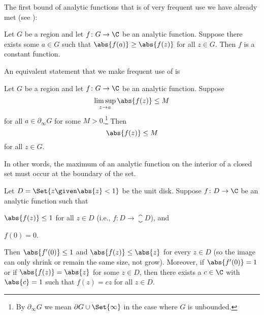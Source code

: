 


The first bound of analytic functions that is of very frequent use we have already met (see ):

\begin{theorem}\label{thm6.1}
	Let $G$ be a region and let $f \colon G \to \C$ be an analytic function.
	Suppose there exists some $a \in G$ such that $\abs{f(a)} \geq \abs{f(z)}$ for all $z \in G$.
	Then $f$ is a constant function.
\end{theorem}

An equivalent statement that we make frequent use of is
\begin{corollary}\label{cor6.2}
	Let $G$ be a region and let $f \colon G \to \C$ be an analytic function.
	Suppose
	\[
		\limsup_{z \to a} \abs{f(z)} \leq M
	\]
	for all $a \in \partial_\infty G$ for some $M > 0$.\footnote{By $\partial_\infty G$ we mean $\partial G \cup \Set{\infty}$ in the case where $G$ is unbounded.}
	Then
	\[
		\abs{f(z)} \leq M
	\]
	for all $z \in G$.
\end{corollary}
In other words, the maximum of an analytic function on the interior of a closed set must occur at the boundary of the set.


\begin{theorem}\label{thm6.2}
	Let $D = \Set{z \given \abs{z} < 1}$ be the unit disk.
	Suppose $f \colon D \to \C$ be an analytic function such that
	\begin{items}
		\item $\abs{f(z)} \leq 1$ for all $z \in D$ (i.e., $f \colon D \to \closure{D}$), and
		\item $f(0) = 0$.
	\end{items}
	Then $\abs{f'(0)} \leq 1$ and $\abs{f(z)} \leq \abs{z}$ for every $z \in D$ (so the image can only shrink or remain the same size, not grow).
	Moreover, if $\abs{f'(0)} = 1$ or if $\abs{f(z)} = \abs{z}$ for some $z \in D$, then there exists a $c \in \C$ with $\abs{c} = 1$ such that $f(z) = c z$ for all $z \in D$.
\end{theorem}

